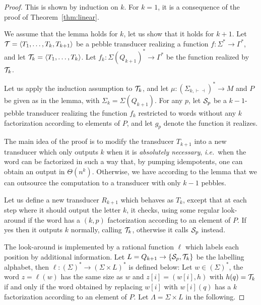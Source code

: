 \begin{proof}
    This is shown by induction on $k$.
    For $k=1$, it is a consequence of the proof of Theorem~\ref{thm:linear}.

    We assume that the lemma holds for $k$, let us show that it holds for $k+1$.
    Let ${\mathcal T}=\langle T_1,\ldots,T_k,T_{k+1} \rangle$ be a pebble transducer realizing a function $f:\Sigma^*\rightarrow\Gamma^*$, and let ${\mathcal T}_k=\langle T_1,\ldots,T_k \rangle$. Let $f_k:\Sigma(Q_{k+1})^*\rightarrow \Gamma^*$ be the function realized by ${\mathcal T}_k$.

    Let us apply the induction assumption to ${\mathcal T}_k$, and let $\mu:(\Sigma_{k,\vdash\dashv})^*\rightarrow M$ and $P$ be given as in the lemma, with $\Sigma_k=\Sigma(Q_{k+1})$. For any $p$, let ${\mathcal S}_p$ be a $k{-}1$-pebble transducer realizing the function $f_k$ restricted to words without any $k$ factorization according to elements of $P$, and let $g_p$ denote the function it realizes.

    The main idea of the proof is to modify the transducer $T_{k+1}$ into a new transducer which only outputs $k$ when it is \emph{absolutely necessary}, \textit{i.e.}~when the word can be factorized in such a way that, by pumping idempotents, one can obtain an output in $\Theta(n^k)$.
    Otherwise, we have according to the lemma that we can outsource the computation to a transducer with only $k-1$ pebbles.

    Let us define a new transducer $R_{k+1}$ which behaves as $T_{k}$, except that at each step where it should output the letter $k$, it checks, using some regular look-around if the word has a $(k,p)$ factorization according to an element of $P$. If yes then it outputs $k$ normally, calling ${\mathcal T}_k$, otherwise it calls ${\mathcal S}_p$ instead.

    The look-around is implemented by a rational function $\ell$ which labels each position by additional information.
    Let $L=Q_{k+1}\rightarrow \{{\mathcal S}_p,{\mathcal T}_k\}$ be the labelling alphabet, then $\ell:(\Sigma)^*\rightarrow (\Sigma\times L)^*$ is defined below:
    Let $w\in (\Sigma)^*$, the word $z=\ell(w)$ has the same size as $w$ and $z[i]=(w[i],h)$ with $h(q)={\mathcal T}_k$ if and only if the word obtained by replacing $w[i]$ with $w[i](q)$ has a $k$ factorization according to an element of $P$.
    Let $\Lambda=\Sigma\times L$ in the following.



\end{proof}

